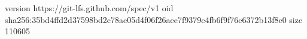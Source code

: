 version https://git-lfs.github.com/spec/v1
oid sha256:35bd4ffd2d37598bd2c78ae05d4f06f26aee7f9379c4fb6f9f76e6372b13f8e0
size 110605
